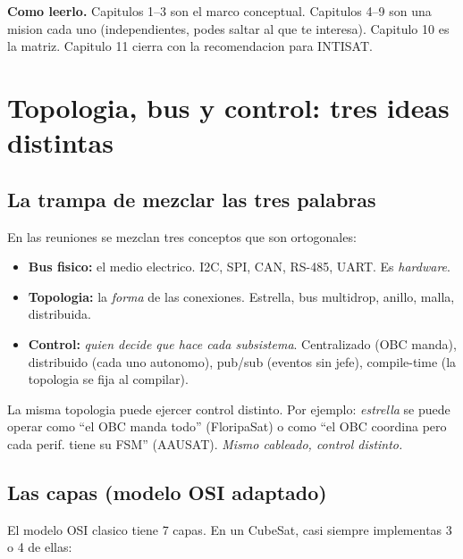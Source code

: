 \documentclass[11pt,a4paper,oneside,openright]{book}
\begin{document}
\textbf{Como leerlo.} Capitulos 1--3 son el marco conceptual. Capitulos
4--9 son una mision cada uno (independientes, podes saltar al que te
interesa). Capitulo 10 es la matriz. Capitulo 11 cierra con la
recomendacion para INTISAT.

\tableofcontents

\mainmatter

\chapter{Topologia, bus y control: tres ideas distintas}

\section{La trampa de mezclar las tres palabras}

En las reuniones se mezclan tres conceptos que son ortogonales:

\begin{itemize}[leftmargin=2em]
  \item \textbf{Bus fisico:} el medio electrico. I2C, SPI, CAN, RS-485,
    UART. Es \emph{hardware}.
  \item \textbf{Topologia:} la \emph{forma} de las conexiones. Estrella,
    bus multidrop, anillo, malla, distribuida.
  \item \textbf{Control:} \emph{quien decide que hace cada subsistema}.
    Centralizado (OBC manda), distribuido (cada uno autonomo),
    pub/sub (eventos sin jefe), compile-time (la topologia se fija al
    compilar).
\end{itemize}

\begin{intui}
La misma topologia puede ejercer control distinto. Por ejemplo:
\emph{estrella} se puede operar como ``el OBC manda todo'' (FloripaSat)
o como ``el OBC coordina pero cada perif. tiene su FSM'' (AAUSAT).
\emph{Mismo cableado, control distinto.}
\end{intui}

\section{Las capas (modelo OSI adaptado)}

El modelo OSI clasico tiene 7 capas. En un CubeSat, casi siempre
implementas 3 o 4 de ellas:
\end{document}
